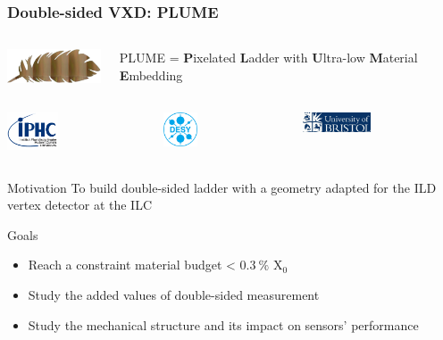 \documentclass{beamer}
\begin{document}
\begin{frame}
  \frametitle{Double-sided VXD: PLUME}

  \begin{columns}[c]
    \begin{column}{3cm}
      \includegraphics[width = 3cm]{Pictures/logo_plume.png}
    \end{column}
    \vspace{-0.2cm}
    \begin{column}{7cm}
      PLUME = \textbf{P}ixelated \textbf{L}adder with \textbf{U}ltra-low \textbf{M}aterial \textbf{E}mbedding
    \end{column}
  \end{columns}

  \begin{columns}[t]
    \begin{column}{1cm}
      \includegraphics[width = 1.5cm]{Pictures/logo_IPHC_10cm.png}
    \end{column}
    \begin{column}{1cm}
      \includegraphics[width = 1cm]{Pictures/DESY-Logo.png}
    \end{column}
    \begin{column}{1cm}
      \includegraphics[width = 2cm]{Pictures/logo_uni_bristol.jpg}
    \end{column}
  \end{columns}

  \vspace{-0.15cm}

  \begin{block}{Motivation}
    To build double-sided ladder with a geometry adapted for the ILD vertex detector at the ILC
  \end{block}

  \begin{block}{Goals}
    \begin{itemize}
      \item Reach a constraint material budget < $0.3~\%$ X$_0$
      \item Study the added values of double-sided measurement
      \item Study the mechanical structure and its impact on sensors' performance
    \end{itemize}
  \end{block}


\end{frame}
\end{document}
